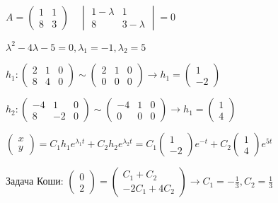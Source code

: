 \documentclass[12pt]{article}
\begin{document}
    $A =
    \begin{pmatrix}
        1 & 1 \\ 8 & 3
    \end{pmatrix} \quad
    \begin{vmatrix}
        1 - \lambda & 1 \\ 8 & 3 - \lambda
    \end{vmatrix} = 0$

    $\lambda^2 - 4\lambda - 5 = 0, \lambda_1 = -1, \lambda_2 = 5$

    $h_1: 
    \left( \begin{array}{cc|c} 2 & 1 & 0 \\ 8 & 4 & 0 \end{array}\right) \sim 
    \left( \begin{array}{cc|c} 2 & 1 & 0 \\ 0 & 0 & 0 \end{array}\right) 
    \to h_1 = \begin{pmatrix}1 \\ -2\end{pmatrix}$

    $h_2: \left( \begin{array}{cc|c} -4 & 1 & 0 \\ 8 & -2 & 0 \end{array}\right) \sim 
    \left( \begin{array}{cc|c} -4 & 1 & 0 \\ 0 & 0 & 0 \end{array}\right)  \to
    h_1 = \begin{pmatrix}1 \\ 4\end{pmatrix}$

    $\begin{pmatrix}x \\ y\end{pmatrix} = C_1 h_1 e^{\lambda_1 t} + C_2 h_2 e^{\lambda_2 t} =
    C_1 \begin{pmatrix}1 \\ -2\end{pmatrix} e^{-t} + C_2 \begin{pmatrix}1 \\ 4\end{pmatrix} e^{5t}$

    Задача Коши: $\begin{pmatrix}0 \\ 2\end{pmatrix} = \begin{pmatrix} C_1 + C_2 \\ -2C_1 + 4C_2 \end{pmatrix} \to C_1 = -\frac{1}{3}, C_2 = \frac{1}{3}$
\end{document}
